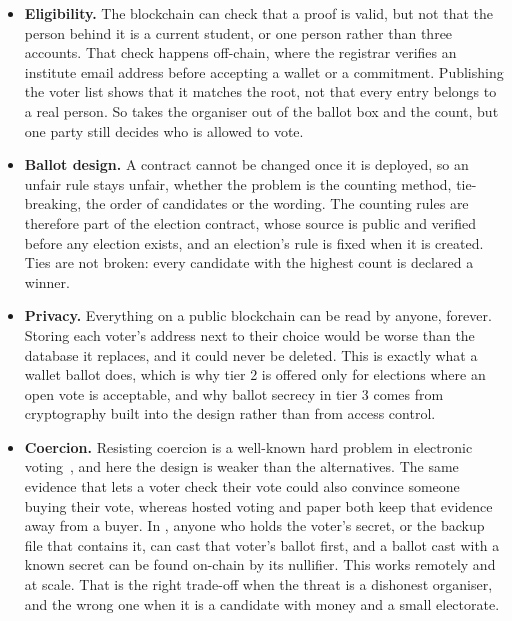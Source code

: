 \begin{itemize}[leftmargin=1.2em,itemsep=2pt,topsep=2pt]
  \item \textbf{Eligibility.} The blockchain can check that a proof is valid,
        but not that the person behind it is a current student, or one person
        rather than three accounts. That check happens off-chain, where the
        registrar verifies an institute email address before accepting a wallet
        or a commitment. Publishing the voter list shows that it matches the
        root, not that every entry belongs to a real person. So \projectname{}
        takes the organiser out of the ballot box and the count, but one party
        still decides who is allowed to vote.

  \item \textbf{Ballot design.} A contract cannot be changed once it is
        deployed, so an unfair rule stays unfair, whether the problem is the
        counting method, tie-breaking, the order of candidates or the wording.
        The counting rules are therefore part of the election contract, whose
        source is public and verified before any election exists, and an
        election's rule is fixed when it is created. Ties are not broken: every
        candidate with the highest count is declared a winner.

  \item \textbf{Privacy.} Everything on a public blockchain can be read by
        anyone, forever. Storing each voter's address next to their choice
        would be worse than the database it replaces, and it could never be
        deleted. This is exactly what a wallet ballot does, which is why tier 2
        is offered only for elections where an open vote is acceptable, and
        why ballot secrecy in tier 3 comes from cryptography built into the
        design rather than from access control.

  \item \textbf{Coercion.} Resisting coercion is a well-known hard problem in
        electronic voting~\cite{jcj}, and here the design is weaker than the
        alternatives. The same evidence that lets a voter check their vote
        could also convince someone buying their vote, whereas hosted voting
        and paper both keep that evidence away from a buyer. In
        \projectname{}, anyone who holds the voter's secret, or the backup file
        that contains it, can cast that voter's ballot first, and a ballot cast
        with a known secret can be found on-chain by its nullifier. This works
        remotely and at scale. That is the right trade-off when the threat is a
        dishonest organiser, and the wrong one when it is a candidate with
        money and a small electorate.
\end{itemize}

